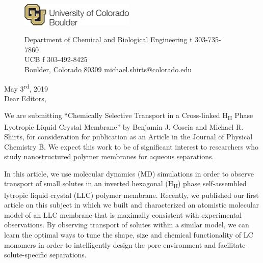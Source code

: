 \documentclass[fontsize=11pt]{article}
\begin{document}
	\graphicspath{{./figures/}}

	\begin{figure}
	\centering
	\begin{minipage}{0.37\textwidth}
	\includegraphics[width=2.14in,left]{CUBoulder.pdf}
	\end{minipage}
	\begin{minipage}{0.62\textwidth}
	\scriptsize
	\noindent Department of Chemical and Biological Engineering \hfill t 303-735-7860~~~~~~~~~~~~~~~~~~ \\
	 UCB \hfill f 303-492-8425~~~~~~~~~~~~~~~~~~ \\
	\noindent Boulder, Colorado 80309 \hfill michael.shirts@colorado.edu \\
	\end{minipage}
	\end{figure}
	
	\noindent May 3\textsuperscript{rd}, 2019\\

	\noindent Dear Editors,\\
	
	\newcommand{\ManuscriptTitle}{Chemically Selective Transport in a Cross-linked 
	H\textsubscript{II} Phase Lyotropic Liquid Crystal Membrane}
	
	We are submitting ``\ManuscriptTitle'' by Benjamin J. Coscia and Michael R. Shirts, for
	consideration for publication as an Article in the Journal of Physical Chemistry
	B. We expect this work to be of significant interest to researchers who study 
	nanostructured polymer membranes for aqueous separations.
	
	In this article, we use molecular dynamics (MD) simulations in order to observe 
	transport of small solutes in an inverted hexagonal (H\textsubscript{II}) phase 
	self-assembled lytropic liquid crystal (LLC) polymer membrane. Recently, we 
	published our first article on this subject in which we built and characterized
	an atomistic molecular model of an LLC membrane that is maximally consistent with experimental
	observations. By observing transport of solutes within a similar model, we can 
	learn the optimal ways to tune the shape, size and chemical functionality
	of LC monomers in order to intelligently design the pore environment and facilitate
	solute-specific separations.
	
\end{document}
